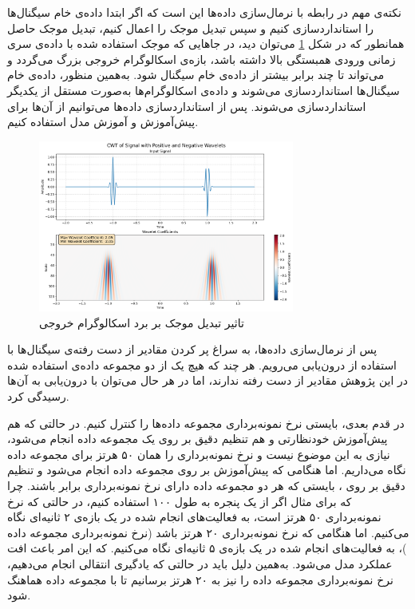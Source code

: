 نکته‌ی مهم در رابطه با نرمال‌سازی داده‌ها این است که اگر ابتدا داده‌ی خام سیگنال‌ها را استانداردسازی کنیم و سپس تبدیل موجک را اعمال کنیم، تبدیل موجک حاصل همانطور که در شکل \ref{fig:unnormalized-wavelet}
می‌توان دید، در جاهایی که موجک استفاده شده با داده‌ی سری زمانی ورودی همبستگی بالا داشته باشد، بازه‌ی اسکالوگرام خروجی بزرگ می‌گردد و می‌تواند تا چند برابر بیشتر از داده‌ی خام سیگنال شود. به‌همین منظور، داده‌ی خام سیگنال‌ها  استانداردسازی می‌شوند و داده‌ی اسکالوگرام‌ها به‌صورت مستقل از یکدیگر استانداردسازی می‌شوند. پس از استانداردسازی داده‌ها می‌توانیم از آن‌ها برای پیش‌آموزش و آموزش مدل استفاده کنیم.

\begin{figure}[htb!]
\centering
\includegraphics[width=0.75\textwidth]{Images/Chapter4/unnormalized-wavelet.png}
\caption{تاثیر تبدیل موجک بر برد اسکالوگرام خروجی}
\label{fig:unnormalized-wavelet}
\end{figure}

پس از نرمال‌سازی داده‌ها، به سراغ پر کردن مقادیر از دست رفته‌ی سیگنال‌ها با استفاده از درون‌یابی می‌رویم. هر چند که هیچ یک از دو مجموعه داده‌ی استفاده شده در این پژوهش مقادیر از دست رفته ندارند، اما در هر حال می‌توان با درون‌یابی به آن‌ها رسیدگی کرد.

در قدم بعدی، بایستی نرخ نمونه‌برداری مجموعه داده‌ها را کنترل کنیم. در حالتی که هم پیش‌آموزش خودنظارتی و هم تنظیم دقیق بر روی یک مجموعه داده انجام می‌شود، نیازی به این موضوع نیست و نرخ نمونه‌برداری را همان ۵۰ هرتز
برای مجموعه داده 
نگاه می‌داریم. اما هنگامی که پیش‌آموزش بر روی مجموعه داده 
انجام می‌شود و تنظیم دقیق بر روی ،
بایستی که هر دو مجموعه داده دارای نرخ نمونه‌برداری برابر باشند. چرا که برای مثال اگر از یک پنجره به طول ۱۰۰ استفاده کنیم، در حالتی که نرخ نمونه‌برداری ۵۰ هرتز است، به فعالیت‌های انجام شده در یک بازه‌ی ۲ ثانیه‌ای نگاه می‌کنیم. اما هنگامی که نرخ نمونه‌برداری ۲۰ هرتز باشد (نرخ نمونه‌برداری مجموعه داده )،
به فعالیت‌های انجام شده در یک بازه‌ی ۵ ثانیه‌ای نگاه می‌کنیم. که این امر باعث افت عملکرد مدل می‌شود. به‌همین دلیل باید در حالتی که یادگیری انتقالی انجام می‌دهیم، نرخ نمونه‌برداری مجموعه داده  را نیز به ۲۰ هرتز برسانیم تا با مجموعه داده 
هماهنگ شود.

